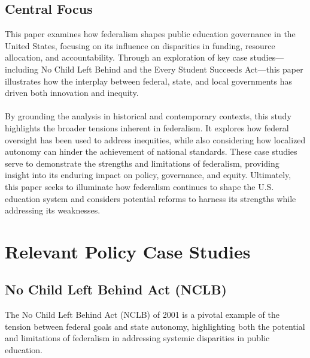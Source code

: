 \documentclass[11pt]{extarticle}
\begin{document}
\subsection{Central Focus}
This paper examines how federalism shapes public education governance in the United States, focusing on its influence on disparities in funding, resource allocation, and accountability. Through an exploration of key case studies—including No Child Left Behind and the Every Student Succeeds Act—this paper illustrates how the interplay between federal, state, and local governments has driven both innovation and inequity.\\
\\
By grounding the analysis in historical and contemporary contexts, this study highlights the broader tensions inherent in federalism. It explores how federal oversight has been used to address inequities, while also considering how localized autonomy can hinder the achievement of national standards. These case studies serve to demonstrate the strengths and limitations of federalism, providing insight into its enduring impact on policy, governance, and equity.
Ultimately, this paper seeks to illuminate how federalism continues to shape the U.S. education system and considers potential reforms to harness its strengths while addressing its weaknesses.




\pagebreak
\section{Relevant Policy Case Studies}
\subsection{No Child Left Behind Act (NCLB)}
The No Child Left Behind Act (NCLB) of 2001 is a pivotal example of the tension between federal goals and state autonomy, highlighting both the potential and limitations of federalism in addressing systemic disparities in public education.
\end{document}
